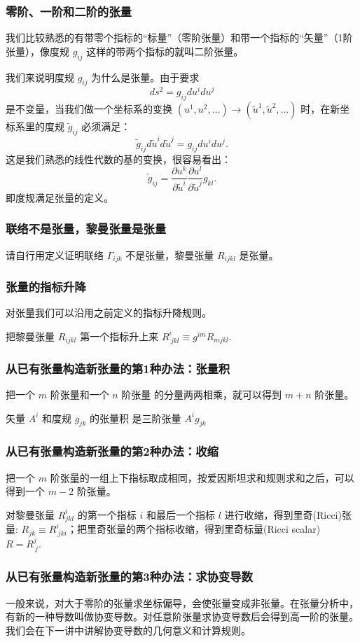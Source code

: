 \documentclass[CJK,13pt]{beamer}
\begin{document}
\begin{frame}
  \frametitle{零阶、一阶和二阶的张量}
  我们比较熟悉的有带零个指标的“标量”（零阶张量）和带一个指标的“矢量”（1阶张量），像度规 $g_{ij}$ 这样的带两个指标的就叫二阶张量。

  我们来说明度规 $g_{ij}$ 为什么是张量。由于要求
  $$ ds^2 =  g_{ij}du^idu^j$$ 是不变量，当我们做一个坐标系的变换 $(u^1,u^2,\ldots)\rightarrow (\tilde{u}^1, \tilde{u}^2, \ldots)$
  时，在新坐标系里的度规 $\tilde{g}_{ij}$ 必须满足：
  $$ \tilde{g}_{ij}d\tilde{u}^id\tilde{u}^j =  g_{ij}du^idu^j.$$
  这是我们熟悉的线性代数的基的变换，很容易看出：
  $$ \tilde{g}_{ij} = \frac{\partial u^k}{\partial \tilde{u}^i} \frac{\partial u^l}{\partial \tilde{u}^j} g_{kl}.$$
  即度规满足张量的定义。
\end{frame}


\begin{frame}
  \frametitle{联络不是张量，黎曼张量是张量}
  请自行用定义证明联络 $\Gamma_{ijk}$ 不是张量，黎曼张量 $R_{ijkl}$ 是张量。

\end{frame}


\begin{frame}
  \frametitle{张量的指标升降}

  对张量我们可以沿用之前定义的指标升降规则。


  把黎曼张量 $R_{ijkl}$ 第一个指标升上来 $R^i_{\ jkl} \equiv g^{im}R_{mjkl}$.
\end{frame}



\begin{frame}
  \frametitle{从已有张量构造新张量的第1种办法：张量积}
  把一个 $m$ 阶张量和一个 $n$ 阶张量 的分量两两相乘，就可以得到 $m+n$ 阶张量。


  矢量 $A^i$ 和度规 $g_{jk}$ 的张量积 是三阶张量 $A^ig_{jk}$
\end{frame}


\begin{frame}
  \frametitle{从已有张量构造新张量的第2种办法：收缩}
  把一个 $m$ 阶张量的一组上下指标取成相同，按爱因斯坦求和规则求和之后，可以得到一个 $m-2$ 阶张量。


  对黎曼张量 $R^i_{jkl}$ 的第一个指标 $i$ 和最后一个指标 $l$ 进行收缩，得到{\blue 里奇(Ricci)张量: $R_{jk} \equiv R^i_{\ jki}$}；把里奇张量的两个指标收缩，得到{\blue 里奇标量(Ricci scalar)  $ R = R^j_{\ j}.$}
\end{frame}


\begin{frame}
  \frametitle{从已有张量构造新张量的第3种办法：求协变导数}
  一般来说，对大于零阶的张量求坐标偏导，会使张量变成非张量。在张量分析中，有新的一种导数叫做协变导数。对任意阶张量求协变导数后会得到高一阶的张量。我们会在下一讲中讲解协变导数的几何意义和计算规则。


\end{frame}


\ech
\end{document}
